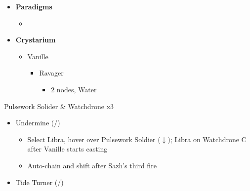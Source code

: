 \begin{paracol}{2}
\begin{menu}
\begin{itemize}
		\end{itemize}
	\end{menu}
	\switchcolumn
	\begin{menu}
		\begin{itemize}
			\item \textbf{Paradigms}
			      \begin{itemize}
				      \item {}%
				            {\paradigmline{\rav}{\rav}{}}%
				            {\paradigmline{\syn}{\sab}{}}%
				            {\paradigmline{\rav}{\med}{}}%
				            {\paradigmline[4]{\textit{\rav}}{\textit{[\sab]}}{}}%
				            {\paradigmline{[\rav]}{\rav}{}}
			      \end{itemize}
			\item \textbf{Crystarium}
			      \begin{itemize}
				      \item Vanille
				            \begin{itemize}
					            \item Ravager
					                  \begin{itemize}
						                  \item 2 nodes, Water
					                  \end{itemize}
				            \end{itemize}
			      \end{itemize}
		\end{itemize}
	\end{menu}
	\switchcolumn*
	\renewcommand{\first}{[1] Dualcasting (\rav/\rav)}
	\renewcommand{\second}{[2] Tide Turner (\syn/\sab)}
	\renewcommand{\third}{[3] Yin \& Yang (\rav/\med)}
	\renewcommand{\fourth}{[4] Undermine (\rav/\sab)}
	\renewcommand{\fifth}{[5] Dualcasting (\rav/\rav)}
	\begin{battle}{Pulsework Solider \& Watchdrone x3}
		\begin{itemize}
			\item \fourth
			      \begin{itemize}
				      \item Select Libra, hover over Pulsework Soldier ($\downarrow$); Libra on Watchdrone C after Vanille starts casting
				      \item Auto-chain and shift after Sazh's third fire
			      \end{itemize}
			\item \second
			      \begin{itemize}

\end{itemize}
\end{itemize}
\end{battle}
\end{paracol}
